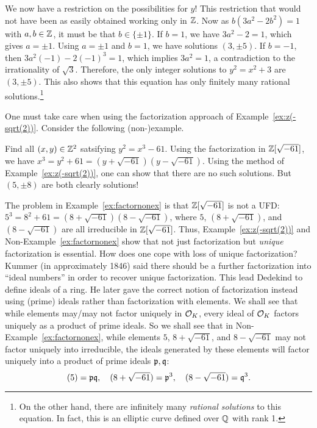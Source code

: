 \begin{ex}
We now have a restriction on the possibilities for $y$! This restriction that would not have been as easily obtained working only in $\mathbb{Z}$. Now as $b (3a^2 - 2b^2)= 1$ with $a, b \in \mathbb{Z}$, it must be that $b \in \{\pm 1\}$. If $b= 1$, we have $3a^2 - 2= 1$, which gives $a= \pm 1$. Using $a= \pm 1$ and $b=1$, we have solutions $(3, \pm 5)$. If $b= -1$, then $3a^2(-1)-2(-1)^3=1$, which implies $3a^2=1$, a contradiction to the irrationality of $\sqrt{3}$. Therefore, the only integer solutions to $y^2= x^2 + 3$ are $(3, \pm 5)$. This also shows that this equation has only finitely many rational solutions.\footnote{On the other hand, there are infinitely many \emph{rational solutions} to this equation. In fact, this is an elliptic curve defined over $\mathbb{Q}$ with rank 1.} \xqed
\end{ex}


One must take care when using the factorization approach of Example~\ref{ex:z(-sqrt(2))}. Consider the following (non-)example. 


\begin{nex}\label{ex:factornonex}
Find all $(x,y) \in \mathbb{Z}^2$ satsifying $y^2=x^3-61$. Using the factorization in $\mathbb{Z}[\sqrt{-61}]$, we have $x^3=y^2+61=(y+\sqrt{-61})(y-\sqrt{-61})$. Using the method of Example~\ref{ex:z(-sqrt(2))}, one can show that there are no such solutions. But $(5, \pm 8)$ are both clearly solutions! \xqed
\end{nex}


The problem in Example~\ref{ex:factornonex} is that $\mathbb{Z}[\sqrt{-61}]$ is not a UFD: $5^3=8^2+61=(8+\sqrt{-61})(8-\sqrt{-61})$, where $5$, $(8+\sqrt{-61})$, and $(8-\sqrt{-61})$ are all irreducible in $\mathbb{Z}[\sqrt{-61}]$. Thus, Example~\ref{ex:z(-sqrt(2))} and Non-Example~\ref{ex:factornonex} show that not just factorization but \emph{unique} factorization is essential.  How does one cope with loss of unique factorization? Kummer (in approximately 1846) said there should be a further factorization into ``ideal numbers'' in order to recover unique factorization. This lead Dedekind to define ideals of a ring. He later gave the correct notion of factorization instead using (prime) ideals rather than factorization with elements. We shall see that while elements may/may not factor uniquely in $\mathcal{O}_K$, every ideal of $\mathcal{O}_K$ factors uniquely as a product of prime ideals. So we shall see that in Non-Example~\ref{ex:factornonex}, while elements $5$, $8 + \sqrt{-61}$, and $8 - \sqrt{-61}$ may not factor uniquely into irreducible, the ideals generated by these elements will factor uniquely into a product of prime ideals $\mathfrak{p}, \mathfrak{q}$:
	\[
	(5)= \mathfrak{p} \mathfrak{q}, \quad (8 + \sqrt{-61})= \mathfrak{p}^3, \quad (8 - \sqrt{-61})= \mathfrak{q}^3. 
	\]


